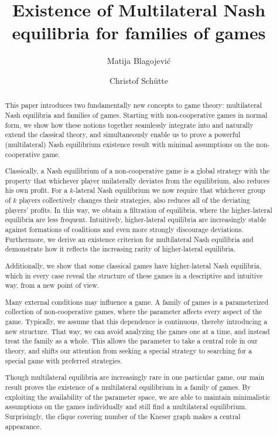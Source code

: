 \documentclass[a4paper,11pt,reqno,english]{amsart}
\author[Blagojevi\'c]{Matija Blagojevi\'{c}}
\author[Sch\"{u}tte]{Christof Sch\"{u}tte}
\title{Existence of Multilateral Nash equilibria for families of games}
\theoremstyle{plain}
\theoremstyle{definition}
\begin{document}
\begin{abstract}
	This paper introduces two fundamentally new concepts to game theory: multilateral Nash equilibria and families of games. Starting with non-cooperative games in normal form, we show how these notions together seamlessly integrate into and naturally extend the classical theory, and simultaneously enable us to prove a powerful (multilateral) Nash equilibrium existence result with minimal assumptions on the non-cooperative game.

	Classically, a Nash equilibrium of a non-cooperative game is a global strategy with the property that whichever player unilaterally deviates from the equilibrium, also reduces his own profit. For a $k$-lateral Nash equilibrium we now require that whichever group of $k$ players collectively changes their strategies, also reduces all of the deviating players' profits. In this way, we obtain a filtration of equilibria, where the higher-lateral equilibria are less frequent. Intuitively, higher-lateral equilibria are increasingly stable against formations of coalitions and even more strongly discourage deviations. Furthermore, we derive an existence criterion for multilateral Nash equilibria and demonstrate how it reflects the increasing rarity of higher-lateral equilibria.

	Additionally, we show that some classical games have higher-lateral Nash equilibria, which in every case reveal the structure of these games in a descriptive and intuitive way, from a new point of view.

	Many external conditions may influence a game. A family of games is a parameterized collection of non-cooperative games, where the parameter affects every aspect of the game. Typically, we assume that this dependence is continuous, thereby introducing a new structure. That way, we can avoid analyzing the games one at a time, and instead treat the family as a whole. This allows the parameter to take a central role in our theory, and shifts our attention from seeking a special strategy to searching for a special game with preferred strategies.

	Though multilateral equilibria are increasingly rare in one particular game, our main result proves the existence of a multilateral equilibrium in a family of games. By exploiting the availability of the parameter space, we are able to maintain minimalistic assumptions on the games individually and still find a multilateral equilibrium. Surprisingly, the clique covering number of the Kneser graph makes a central appearance.


\end{abstract}
\end{document}
